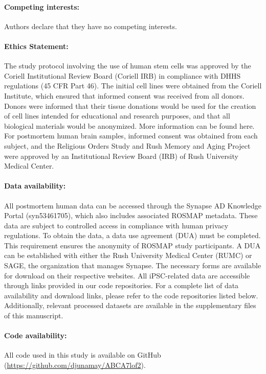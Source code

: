 \paragraph{Competing interests:} Authors declare that they have no competing interests.


\paragraph{Ethics Statement:} The study protocol involving the use of human stem cells was approved by the Coriell Institutional Review Board (Coriell IRB) in compliance with DHHS regulations (45 CFR Part 46). The initial cell lines were obtained from the Coriell Institute, which ensured that informed consent was received from all donors. Donors were informed that their tissue donations would be used for the creation of cell lines intended for educational and research purposes, and that all biological materials would be anonymized. More information can be found here. For postmortem human brain samples, informed consent was obtained from each subject, and the Religious Orders Study and Rush Memory and Aging Project were approved by an Institutional Review Board (IRB) of Rush University Medical Center.


\paragraph{Data availability:} All postmortem human data can be accessed through the Synapse AD Knowledge Portal (syn53461705), which also includes associated ROSMAP metadata. These data are subject to controlled access in compliance with human privacy regulations. To obtain the data, a data use agreement (DUA) must be completed. This requirement ensures the anonymity of ROSMAP study participants. A DUA can be established with either the Rush University Medical Center (RUMC) or SAGE, the organization that manages Synapse. The necessary forms are available for download on their respective websites. All iPSC-related data are accessible through links provided in our code repositories. For a complete list of data availability and download links, please refer to the code repositories listed below. Additionally, relevant processed datasets are available in the supplementary files of this manuscript.


\paragraph{Code availability:} All code used in this study is available on GitHub (\url{https://github.com/djunamay/ABCA7lof2}).